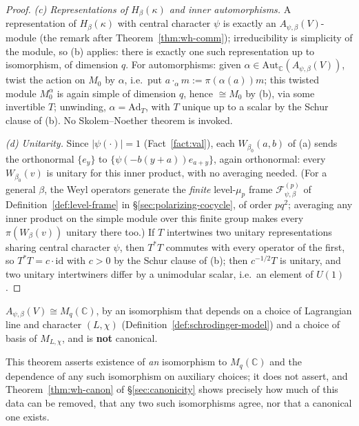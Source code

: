 \begin{proof}
\emph{(c) Representations of $H_\beta(\kappa)$ and inner automorphisms.} A
representation of $H_\beta(\kappa)$ with central character $\psi$ is exactly
an $A_{\psi,\beta}(V)$-module (the remark after Theorem~\ref{thm:wh-comm});
irreducibility is simplicity of the module, so (b) applies: there is exactly
one such representation up to isomorphism, of dimension $q$. For
automorphisms: given $\alpha\in\mathrm{Aut}_{\mathbb{C}}(A_{\psi,\beta}(V))$,
twist the action on $M_0$ by $\alpha$, i.e.\ put $a\cdot_\alpha m:=\pi(\alpha(a))m$;
this twisted module $M_0^\alpha$ is again simple of dimension $q$, hence
$\cong M_0$ by (b), via some invertible $T$; unwinding, $\alpha=\mathrm{Ad}_T$,
with $T$ unique up to a scalar by the Schur clause of (b). No
Skolem--Noether theorem is invoked.

\emph{(d) Unitarity.} Since $|\psi(\cdot)|=1$ (Fact~\ref{fact:val}), each
$W_{\beta_0}(a,b)$ of (a) sends the orthonormal $\{e_y\}$ to
$\{\psi(-b(y+a))e_{a+y}\}$, again orthonormal: every $W_{\beta_0}(v)$ is
unitary for this inner product, with no averaging needed. (For a general
$\beta$, the Weyl operators generate the \emph{finite} level-$\mu_p$ frame
$\mathcal{F}^{(p)}_{\psi,\beta}$ of Definition~\ref{def:level-frame} in
\S\ref{sec:polarizing-cocycle}, of order $p q^2$; averaging any inner product
on the simple module over this finite group makes every $\pi(W_\beta(v))$
unitary there too.) If $T$ intertwines two unitary representations sharing
central character $\psi$, then $T^*T$ commutes with every operator of the
first, so $T^*T=c\cdot\mathrm{id}$ with $c>0$ by the Schur clause of (b); then
$c^{-1/2}T$ is unitary, and two unitary intertwiners differ by a unimodular
scalar, i.e.\ an element of $U(1)$.
\end{proof}

\statusProved
\begin{theorem}
\label{thm:wh-alg-mat}
$A_{\psi,\beta}(V) \cong M_q(\mathbb{C})$, by an isomorphism that depends on
a choice of Lagrangian line and character $(L,\chi)$ (Definition~\ref{def:schrodinger-model})
and a choice of basis of $M_{L,\chi}$, and is \textbf{not} canonical.
\end{theorem}

\begin{scope}
This theorem asserts existence of \emph{an} isomorphism to $M_q(\mathbb{C})$
and the dependence of any such isomorphism on auxiliary choices; it does not
assert, and Theorem~\ref{thm:wh-canon} of \S\ref{sec:canonicity} shows
precisely how much of this data can be removed, that any two such
isomorphisms agree, nor that a canonical one exists.
\end{scope}

